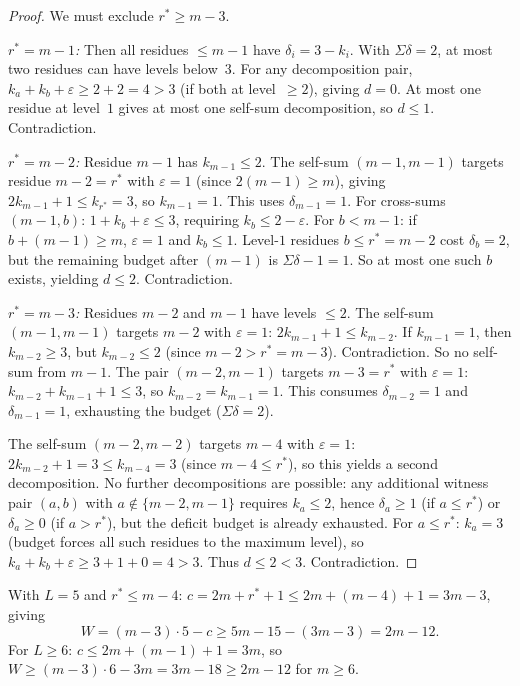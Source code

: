\documentclass[11pt]{amsart}
\theoremstyle{definition}
\theoremstyle{remark}
\begin{document}
\begin{proof}
We must exclude $r^* \ge m - 3$.

\emph{$r^* = m - 1$:} Then all residues $\le m-1$ have $\delta_i = 3 - k_i$.
With $\Sigma\delta = 2$, at most two residues can have levels below~$3$.
For any decomposition pair, $k_a + k_b + \varepsilon \ge 2 + 2 = 4 > 3$
(if both at level~$\ge 2$), giving $d = 0$.  At most one residue at
level~$1$ gives at most one self-sum decomposition, so $d \le 1$.
Contradiction.

\emph{$r^* = m - 2$:} Residue $m - 1$ has $k_{m-1} \le 2$.
The self-sum $(m-1, m-1)$ targets residue $m - 2 = r^*$ with
$\varepsilon = 1$ (since $2(m-1) \ge m$), giving
$2k_{m-1} + 1 \le k_{r^*} = 3$, so $k_{m-1} = 1$.
This uses $\delta_{m-1} = 1$.  For cross-sums $(m-1, b)$:
$1 + k_b + \varepsilon \le 3$, requiring $k_b \le 2 - \varepsilon$.
For $b < m - 1$: if $b + (m-1) \ge m$, $\varepsilon = 1$ and $k_b \le 1$.
Level-$1$ residues $b \le r^* = m-2$ cost $\delta_b = 2$, but the
remaining budget after $(m-1)$ is $\Sigma\delta - 1 = 1$.  So at most
one such $b$ exists, yielding $d \le 2$.  Contradiction.

\emph{$r^* = m - 3$:} Residues $m-2$ and $m-1$ have levels $\le 2$.
The self-sum $(m-1, m-1)$ targets $m - 2$ with $\varepsilon = 1$:
$2k_{m-1} + 1 \le k_{m-2}$.  If $k_{m-1} = 1$, then $k_{m-2} \ge 3$,
but $k_{m-2} \le 2$ (since $m-2 > r^* = m-3$).  Contradiction.
So no self-sum from $m-1$.  The pair $(m-2, m-1)$ targets $m-3 = r^*$
with $\varepsilon = 1$: $k_{m-2} + k_{m-1} + 1 \le 3$, so
$k_{m-2} = k_{m-1} = 1$.  This consumes $\delta_{m-2} = 1$ and
$\delta_{m-1} = 1$, exhausting the budget ($\Sigma\delta = 2$).

The self-sum $(m-2, m-2)$ targets $m-4$ with $\varepsilon = 1$:
$2k_{m-2} + 1 = 3 \le k_{m-4} = 3$ (since $m - 4 \le r^*$), so this
yields a second decomposition.  No further decompositions are possible:
any additional witness pair $(a, b)$ with $a \notin \{m-2, m-1\}$
requires $k_a \le 2$, hence $\delta_a \ge 1$ (if $a \le r^*$) or
$\delta_a \ge 0$ (if $a > r^*$), but the deficit budget is already
exhausted.  For $a \le r^*$: $k_a = 3$ (budget forces all such residues
to the maximum level), so $k_a + k_b + \varepsilon \ge 3 + 1 + 0 = 4 > 3$.
Thus $d \le 2 < 3$.  Contradiction.
\end{proof}

With $L = 5$ and $r^* \le m - 4$:
$c = 2m + r^* + 1 \le 2m + (m - 4) + 1 = 3m - 3$, giving
\[
  W = (m - 3) \cdot 5 - c \ge 5m - 15 - (3m - 3) = 2m - 12.
\]
For $L \ge 6$: $c \le 2m + (m-1) + 1 = 3m$, so
$W \ge (m - 3) \cdot 6 - 3m = 3m - 18 \ge 2m - 12$ for $m \ge 6$.
\end{document}
